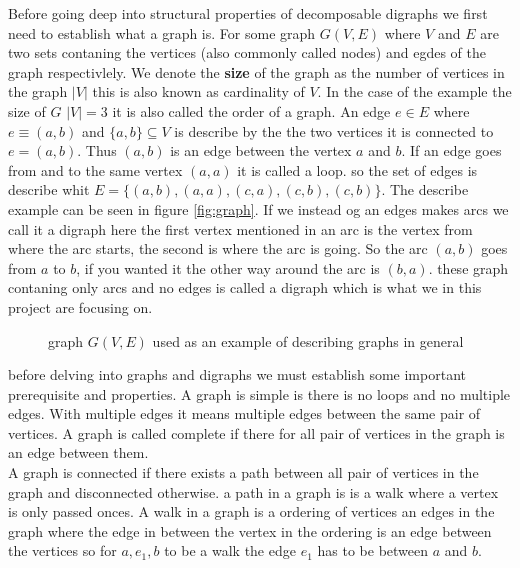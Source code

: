 Before going deep into structural properties of decomposable digraphs we first need to establish what a graph is.
For some graph $G(V,E)$ where $V$ and $E$ are two sets contaning the vertices (also commonly called nodes) and egdes of the graph respectivlely.
We denote the \textbf{size} of the graph as the number of vertices in the graph $|V|$ this is also known as cardinality of $V$.
In the case of the example the size of $G$ $|V|=3$ it is also called the order of a graph.
An edge $e \in E$ where $e \equiv (a, b)$ and $\{ a, b \} \subseteq V$ is describe by the the two vertices it is connected to $e=(a,b)$.
Thus $(a,b)$ is an edge between the vertex $a$ and $b$.
If an edge goes from and to the same vertex $(a,a)$ it is called a loop.
so the set of edges is describe whit $E=\lbrace (a,b),(a,a),(c,a),(c,b),(c,b)\rbrace$.
The describe example can be seen in figure \autoref{fig:graph}.
If we instead og an edges makes arcs we call it a digraph here the first vertex mentioned in an arc is the vertex from where the arc starts, the second is where the arc is going.
So the arc $(a,b)$ goes from $a$ to $b$, if you wanted it the other way around the arc is $(b,a)$.
these graph contaning only arcs and no edges is called a digraph which is what we in this project are focusing on.\\
\begin{figure}[!h]
    \centering
    \label{fig:graph}
    \caption{graph $G(V,E)$ used as an example of describing graphs in general}
\end{figure}


before delving into graphs and digraphs we must establish some important prerequisite and properties. 
A graph is simple is there is no loops and no multiple edges. 
With multiple edges it means multiple edges between the same pair of vertices.
A graph is called complete if there for all pair of vertices in the graph is an edge between them.\\
A graph is connected if there exists a path between all pair of vertices in the graph and disconnected otherwise.
a path in a graph is is a walk where a vertex is only passed onces.
A walk in a graph is a ordering of vertices an edges in the graph where the edge in between the vertex in the ordering is an edge between the vertices so for $a,e_1,b$ to be a walk the edge $e_1$ has to be between $a$ and $b$.

